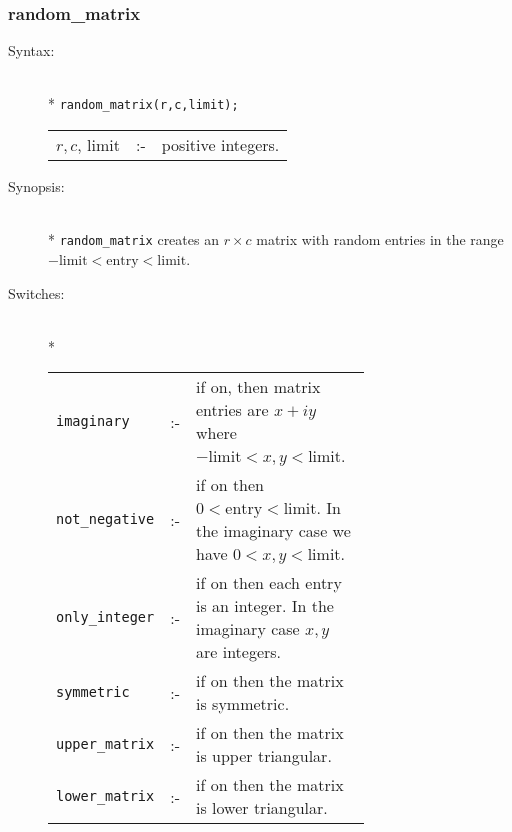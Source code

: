 \subsubsection{random\_matrix}
\label{linalg:random_matrix}

\begin{description}
\item[Syntax:]\mbox{}\\*
\texttt{random\_matrix(r,c,limit);}\\[2mm]
\begin{tabular}{l l l} 
$r,c$, limit &:-& positive integers. \\
\end{tabular}

\item[Synopsis:]\mbox{}\\*
\texttt{random\_matrix} creates an $r\times c$ matrix with random entries in the
range $-\text{limit} < \text{entry} < \text{limit}$.

\item[Switches:]\mbox{}\\*
\begin{tabular}{l l p{0.685\linewidth}}
\texttt{imaginary}  &:-& if 
on, then matrix entries are $x+iy$ where $-\text{limit} < x,y < \text{limit}$.\\
\texttt{not\_negative} &:-& if on then $0 < 
\text{entry} < \text{limit}$. In the imaginary case we have $0<x,y<\text{limit}$.\\
\texttt{only\_integer} &:-& if on then each 
entry is an integer. In the imaginary case $x,y$ are integers.\\
\texttt{symmetric} &:-& if on then the matrix is symmetric. \\
\texttt{upper\_matrix} &:-& if on then the 
matrix is upper triangular. \\
\texttt{lower\_matrix} &:-& if on then the matrix is lower triangular.
\end{tabular}


\end{description}
